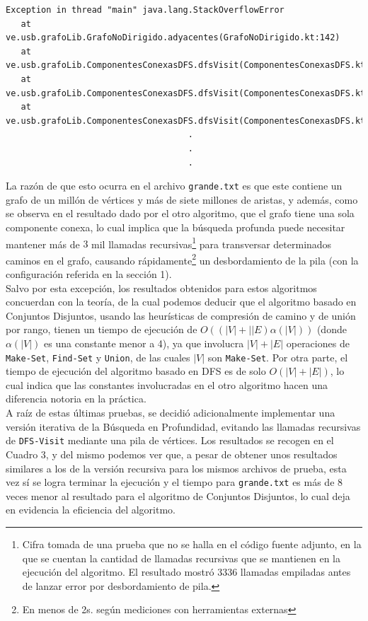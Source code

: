 \documentclass[11pt]{article}
\begin{document}
\begin{lstlisting}
Exception in thread "main" java.lang.StackOverflowError
   at ve.usb.grafoLib.GrafoNoDirigido.adyacentes(GrafoNoDirigido.kt:142)
   at ve.usb.grafoLib.ComponentesConexasDFS.dfsVisit(ComponentesConexasDFS.kt:52)
   at ve.usb.grafoLib.ComponentesConexasDFS.dfsVisit(ComponentesConexasDFS.kt:57)
   at ve.usb.grafoLib.ComponentesConexasDFS.dfsVisit(ComponentesConexasDFS.kt:57)
                                    .
                                    .
                                    .
\end{lstlisting}

La razón de que esto ocurra en el archivo \texttt{grande.txt} es que este contiene un
grafo de un millón de vértices y más de siete millones de aristas, y además, como
se observa en el resultado dado por el otro algoritmo, que el grafo tiene una sola
componente conexa, lo cual implica que la búsqueda profunda puede necesitar mantener
más de $3$ mil llamadas recursivas\footnote{Cifra tomada de una prueba que no se halla en el código fuente adjunto, en
la que se cuentan la cantidad de llamadas recursivas que se mantienen en la ejecución 
del algoritmo. El resultado mostró 3336 llamadas empiladas antes de lanzar error por
desbordamiento de pila.} para transversar determinados caminos en el grafo,
causando rápidamente\footnote{En menos de 2s. según mediciones con herramientas externas}
un desbordamiento de la pila (con la configuración referida
en la sección 1). \\

Salvo por esta excepción, los resultados obtenidos para estos algoritmos concuerdan con
la teoría, de la cual podemos deducir que el algoritmo basado en Conjuntos Disjuntos,
usando las heurísticas de compresión de camino y de unión por rango, tienen un tiempo
de ejecución de $O((|V|+||E)\alpha(|V|))$ (donde $\alpha(|V|)$ es una constante menor a
4), ya que involucra $|V| + |E|$ operaciones de \texttt{Make-Set}, \texttt{Find-Set} y 
\texttt{Union}, de las cuales $|V|$ son \texttt{Make-Set}. Por otra parte, el tiempo de 
ejecución del algoritmo basado en DFS es de solo $O(|V|+|E|)$, lo cual indica que las 
constantes involucradas en el otro algoritmo hacen una diferencia notoria en la práctica. \\

A raíz de estas últimas pruebas, se decidió adicionalmente implementar una versión iterativa
de la Búsqueda en Profundidad, evitando las llamadas recursivas de \texttt{DFS-Visit} mediante
una pila de vértices. Los resultados se recogen en el Cuadro 3, y del mismo podemos ver que,
a pesar de obtener unos resultados similares a los de la versión recursiva para los mismos
archivos de prueba, esta vez sí se logra terminar la ejecución y el tiempo para \texttt{grande.txt}
es más de $8$ veces menor al resultado para el algoritmo de Conjuntos Disjuntos, lo cual 
deja en evidencia la eficiencia del algoritmo.
\end{document}
